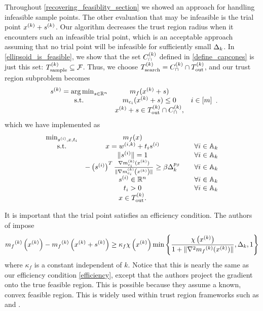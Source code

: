 Throughout \cref{recovering_feasiblity_section} we showed an approach for handling infeasible sample points.
The other evaluation that may be infeasible is the trial point $x^{(k)} + {{s}^{(k)}}$.
Our algorithm decreases the trust region radius when it encounters such an infeasible trial point,
which is an acceptable approach assuming that no trial point will be infeasible for sufficiently small $\Delta_k$.
In \cref{ellipsoid_is_feasible}, we show that the set ${C^{(k)}_{\cap}}$ defined in \cref{define_capcones} is just this set: ${T_{\text{sample}}^{(k)}} \subseteq {\mathcal F}$.
Thus, we choose $ {T_{\text{search}}^{(k)}} = {C^{(k)}_{\cap}} \cap {T_{\text{out}}^{(k)}}$, and our trust region subproblem becomes
\begin{align}
\label{capcones_trust_region_subproblem}
\begin{array}{ccc}
{{s}^{(k)}} = \operatorname*{arg\,min}_{s \in \mathbb R^n} & m_{f}(x^{(k)} + s) & \\
\textrm{s.t.} & m_{c_i}(x^{(k)} + s) \le 0 & i \in [m]\\
& x^{(k)} + s \in {T_{\text{out}}^{(k)}} \cap {C^{(k)}_{\cap}}, &
\end{array}.
\end{align}
which we have implemented as
\begin{align}
\label{capcones_tr_subproblem}
\begin{array}{ccc}
\min_{s^{(i)},x,t_i} & m_f(x) & \\
\textrm{s.t.}  & x = {w^{(i, k)}} + t _i s^{(i)} & \quad \forall i \in {\mathbb A_{k}} \\
 & \|s^{(i)}\| = 1 & \quad \forall i \in {\mathbb A_{k}} \\
 & -\left(s^{(i)}\right)^T{\frac{\nabla m^{(k)}_{c_i}(x^{(k)})}{\|\nabla m^{(k)}_{c_i}\left(x^{(k)}\right)\|}} \ge \beta \Delta_k^{p_{\beta}} & \quad \forall i \in {\mathbb A_{k}} \\
 & s^{(i)} \in \mathbb R^n  & \quad \forall i \in {\mathbb A_{k}} \\
 & t_i > 0          & \quad \forall i \in {\mathbb A_{k}} \\
 & x \in {T_{\text{out}}^{(k)}}.		& \\
\end{array}
\end{align}

It is important that the trial point satisfies an efficiency condition.
The authors of \cite{Conejo:2013:GCT:2620806.2621814} impose 
\begin{align*}
{{m}_f}^{(k)}\left(x^{(k)}\right) - {{m}_f}^{(k)}\left(x^{(k)} + {{s}^{(k)}}\right) \ge \kappa_f \chi\left(x^{(k)}\right) \min\left\{ \frac{\chi\left(x^{(k)}\right)}{1+\|\nabla^2 {{m}_f}^{(k)}(x^{(k)})\|}, \Delta_k, 1 \right\}
\end{align*}
where $\kappa_f$ is a constant independent of $k$.
Notice that this is nearly the same as our efficiency condition \cref{efficiency}, except that the authors project the gradient onto the true feasible region.
This is possible because they assume a known, convex feasible region.
This is widely used within trust region frameworks such as \cite{Conejo:2013:GCT:2620806.2621814} and \cite{Conn:2000:TM:357813}.

